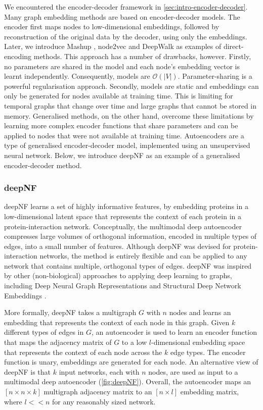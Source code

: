 We encountered the encoder-decoder framework in \ref{sec:intro-encoder-decoder}. Many graph embedding methods are based on encoder-decoder models. The encoder first maps nodes to low-dimensional embeddings, followed by reconstruction of the original data by the decoder, using only the embeddings. Later, we introduce Mashup \cite{Cho2016}, node2vec \cite{Grover2016} and DeepWalk \cite{Perozzi2014} as examples of direct-encoding methods. This approach has a number of drawbacks, however. Firstly, no parameters are shared in the model and each node's embedding vector is learnt independently. Consequently, models are $\mathcal{O}(|V|)$. Parameter-sharing is a powerful regularisation approach. Secondly, models are static and embeddings can only be generated for nodes available at training time. This is limiting for temporal graphs that change over time and large graphs that cannot be stored in memory. Generalised methods, on the other hand, overcome these limitations by learning more complex encoder functions that share parameters and can be applied to nodes that were not available at training time. Autoencoders are a type of generalised encoder-decoder model, implemented using an unsupervised neural network. Below, we introduce deepNF \cite{Gligorijevic2018} as an example of a generalised encoder-decoder method.

\subsubsection{deepNF}
\label{sec:intro-deepnf}

deepNF \cite{Gligorijevic2018} learns a set of highly informative features, by embedding proteins in a low-dimensional latent space that represents the context of each protein in a protein-interaction network. Conceptually, the multimodal deep autoencoder compresses large volumes of orthogonal information, encoded in multiple types of edges, into a small number of features. Although deepNF was devised for protein-interaction networks, the method is entirely flexible and can be applied to any network that contains multiple, orthogonal types of edges. deepNF was inspired by other (non-biological) approaches to applying deep learning to graphs, including Deep Neural Graph Representations \cite{Cao2016a} and Structural Deep Network Embeddings \cite{Wang2016}.

More formally, deepNF takes a multigraph $G$ with $n$ nodes and learns an embedding that represents the context of each node in this graph. Given $k$ different types of edges in $G$, an autoencoder is used to learn an encoder function that maps the adjacency matrix of $G$ to a low $l$-dimensional embedding space that represents the context of each node across the $k$ edge types. The encoder function is unary, embeddings are generated for each node. An alternative view of deepNF is that $k$ input networks, each with $n$ nodes, are used as input to a multimodal deep autoencoder (\ref{fig:deepNF}). Overall, the autoencoder maps an $[n \times n \times k]$ multigraph adjacency matrix to an $[n \times l]$ embedding matrix, where $l << n$ for any reasonably sized network.

